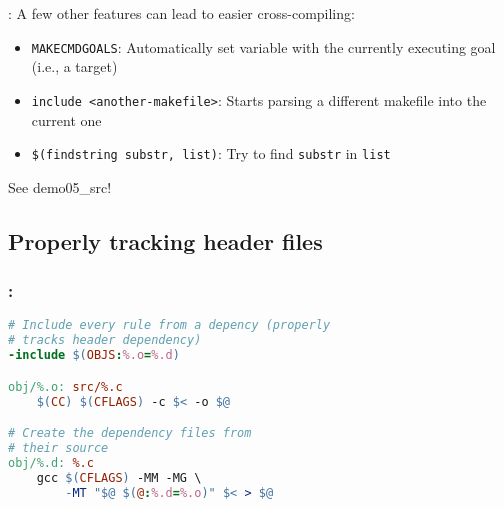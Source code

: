\begin{frame}{\secname: \small\subsecname\normalsize}
    A few other features can lead to easier cross-compiling:

    \begin{itemize}
        \item \texttt{MAKECMDGOALS}: Automatically set variable with the currently executing goal (i.e., a target)
        \item \texttt{include <another-makefile>}: Starts parsing a different makefile into the current one
        \item \texttt{\$(findstring substr, list)}: Try to find \texttt{substr} in \texttt{list}
    \end{itemize}

    See demo05\_src!
\end{frame}

\subsection{Properly tracking header files}
\begin{frame}[fragile]
    \frametitle{\secname: \small\subsecname\normalsize}

    \begin{lstlisting}[language=make]
# Include every rule from a depency (properly
# tracks header dependency)
-include $(OBJS:%.o=%.d)

obj/%.o: src/%.c
    $(CC) $(CFLAGS) -c $< -o $@

# Create the dependency files from
# their source
obj/%.d: %.c
    gcc $(CFLAGS) -MM -MG \
        -MT "$@ $(@:%.d=%.o)" $< > $@
    \end{lstlisting}

\end{frame}
